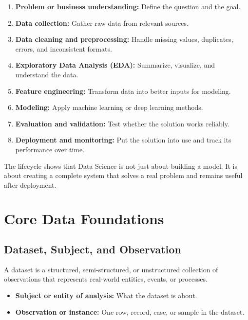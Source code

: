 \documentclass[11pt,a4paper]{article}
\begin{document}
\begin{enumerate}[leftmargin=*]
  \item \textbf{Problem or business understanding:} Define the question and the goal.
  \item \textbf{Data collection:} Gather raw data from relevant sources.
  \item \textbf{Data cleaning and preprocessing:} Handle missing values, duplicates, errors, and inconsistent formats.
  \item \textbf{Exploratory Data Analysis (EDA):} Summarize, visualize, and understand the data.
  \item \textbf{Feature engineering:} Transform data into better inputs for modeling.
  \item \textbf{Modeling:} Apply machine learning or deep learning methods.
  \item \textbf{Evaluation and validation:} Test whether the solution works reliably.
  \item \textbf{Deployment and monitoring:} Put the solution into use and track its performance over time.
\end{enumerate}

\begin{conceptbox}
The lifecycle shows that Data Science is not just about building a model. It is about creating a complete system that solves a real problem and remains useful after deployment.
\end{conceptbox}

\section{Core Data Foundations}

\subsection{Dataset, Subject, and Observation}

\begin{definitionbox}[Dataset]
A dataset is a structured, semi-structured, or unstructured collection of observations that represents real-world entities, events, or processes.
\end{definitionbox}

\begin{itemize}[leftmargin=*]
  \item \textbf{Subject or entity of analysis:} What the dataset is about.
  \item \textbf{Observation or instance:} One row, record, case, or sample in the dataset.
\end{itemize}
\end{document}
